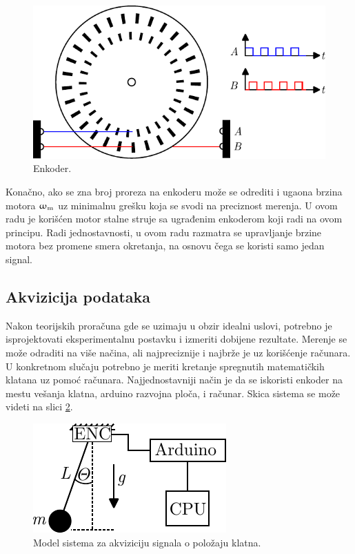 \documentclass[a4paper, 12pt, diplomski]{etf}
\begin{document}
\begin{figure}[h!]
    \centering
    \includegraphics[scale=1]{fig/enc.pdf}
    \caption{Enkoder.}
    \label{enc}
\end{figure}


Konačno, ako se zna broj proreza na enkoderu može se odrediti i ugaona brzina motora $\upomega_{\rm m}$ uz minimalnu grešku koja se svodi na preciznost merenja. U ovom radu je korišćen motor stalne struje sa ugrađenim enkoderom koji radi na ovom principu. Radi jednostavnosti, u ovom radu razmatra se upravljanje brzine motora bez promene smera okretanja, na osnovu čega se koristi samo jedan signal.
\cite{encArduino}


\subsection{Akvizicija podataka} 
\label{sec:Akvzicija} \label{s:Akvizicija}

Nakon teorijskih proračuna gde se uzimaju u obzir idealni uslovi, potrebno je isprojektovati eksperimentalnu postavku i izmeriti dobijene rezultate. Merenje se može odraditi na više načina, ali najpreciznije i najbrže je uz korišćenje računara. U konkretnom slučaju potrebno je meriti kretanje spregnutih matematičkih klatana uz pomoć računara. Najjednostavniji način je da se iskoristi enkoder na mestu vešanja klatna, arduino razvojna ploča, i računar. Skica sistema se može videti na slici \ref{akvizicija}.


\begin{figure}[h!]
    \centering
    \includegraphics[scale=1.5]{imgs_teorija/akvizicija.pdf}
    \caption{Model sistema za akviziciju signala o položaju klatna.}
    \label{akvizicija}
\end{figure}
\end{document}

